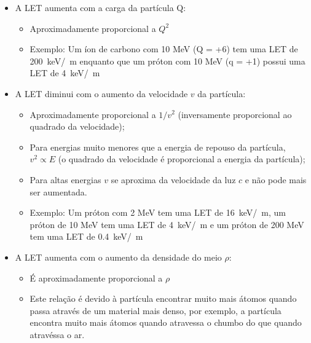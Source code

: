 \documentclass[11pt,a4paper]{article}
\newcounter{exemplo}
\begin{document}
            \begin{itemize}
                \item A LET aumenta com a carga da partícula Q: 
                    
                    \begin{itemize}
                        \item Aproximadamente proporcional a $Q^2$
                            
                        \item Exemplo: Um íon de carbono com 10 MeV (Q = +6) tem uma LET de \qty{200}{keV/\mu m} enquanto que um próton com 10 MeV (q = +1) possui uma LET de \qty{4}{keV/\mu m}
                    \end{itemize}
    
                \item A LET diminui com o aumento da velocidade $v$ da partícula:
                    
                    \begin{itemize}
                        \item Aproximadamente proporcional a $1/v^2$ (inversamente proporcional ao quadrado da velocidade);
                            
                        \item Para energias muito menores que a energia de repouso da partícula, $v^2 \propto E$ (o quadrado da velocidade é proporcional a energia da partícula);
                            
                        \item Para altas energias $v$ se aproxima da velocidade da luz $c$ e não pode mais ser aumentada.
                            
                        \item Exemplo: Um próton com 2 MeV tem uma LET de \qty{16}{keV/\mu m}, um próton de 10 MeV tem uma LET de \qty{4}{keV/\mu m} e um próton de 200 MeV tem uma LET de \qty{0.4}{keV/\mu m}
                    \end{itemize}
    
                \item A LET aumenta com o aumento da densidade do meio $\rho$:
                    
                    \begin{itemize}
                        \item É aproximadamente proporcional a $\rho$
                        \item Este relação é devido à partícula encontrar muito mais átomos quando passa através de um material mais denso, por exemplo, a partícula encontra muito mais átomos quando atravessa o chumbo do que quando atravéssa o ar. 
                    \end{itemize}
    

\end{itemize}
\end{document}
